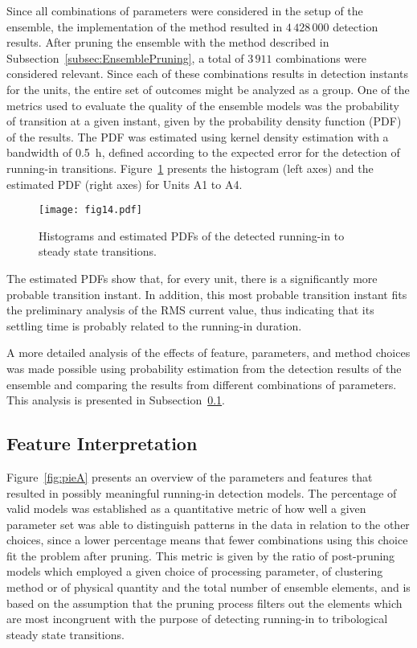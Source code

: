 \documentclass[preprint,11pt,number]{elsarticle}
\begin{document}
Since all combinations of parameters were considered in the setup of the ensemble, the implementation of the method resulted in $4\,428\,000$ detection results. After pruning the ensemble with the method described in Subsection~\ref{subsec:EnsemblePruning}, a total of $3\,911$ combinations were considered relevant. Since each of these combinations results in detection instants for the units, the entire set of outcomes might be analyzed as a group. One of the metrics used to evaluate the quality of the ensemble models was the probability of transition at a given instant, given by the probability density function (PDF) of the results. The PDF was estimated using kernel density estimation with a bandwidth of \SI{0.5}{\hour}, defined according to the expected error for the detection of running-in transitions. Figure~\ref{fig:Hist_Pdf_Geral_A} presents the histogram (left axes) and the estimated PDF (right axes) for Units A1 to A4.

\begin{figure}[htb]
\begin{center}
\texttt{[image: fig14.pdf]}    %
\caption{Histograms and estimated PDFs of the detected running-in to steady state transitions.} 
\label{fig:Hist_Pdf_Geral_A}
\end{center}
\end{figure}

The estimated PDFs show that, for every unit, there is a significantly more probable transition instant. In addition, this most probable transition instant fits the preliminary analysis of the RMS current value, thus indicating that its settling time is probably related to the running-in duration. 

A more detailed analysis of the effects of feature, parameters, and method choices was made possible using probability estimation from the detection results of the ensemble and comparing the results from different combinations of parameters. This analysis is presented in Subsection~\ref{subsec:FeatureInterpretation}.

\subsection{Feature Interpretation}\label{subsec:FeatureInterpretation}

Figure~\ref{fig:pieA} presents an overview of the parameters and features that resulted in possibly meaningful running-in detection models. The percentage of valid models was established as a quantitative metric of how well a given parameter set was able to distinguish patterns in the data in relation to the other choices, since a lower percentage means that fewer combinations using this choice fit the problem after pruning. This metric is given by the ratio of post-pruning models which employed a given choice of processing parameter, of clustering method or of physical quantity and the total number of ensemble elements, and is based on the assumption that the pruning process filters out the elements which are most incongruent with the purpose of detecting running-in to tribological steady state transitions.
\end{document}
